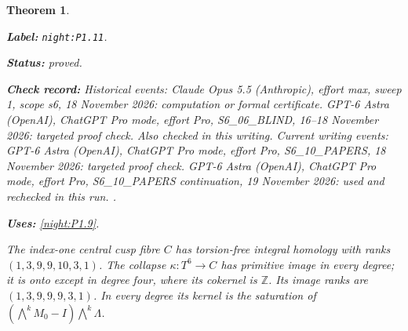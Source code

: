 \documentclass[11pt,a4paper]{article}
\newtheorem{theorem}{Theorem}[section]
\theoremstyle{definition}
\newcommand{\StatementRecord}[4]{\par\smallskip\begingroup\upshape\raggedright\noindent\textbf{Label:} \nolinkurl{#1}.\par\noindent\textbf{Status:} #2.\par\noindent\textbf{Check record:} #3.\par\noindent\textbf{Uses:} #4.\par\endgroup\smallskip}
\begin{document}
\begin{theorem}\label{night:P1.11}
\StatementRecord{night:P1.11}{proved}{Historical events: Claude Opus 5.5 (Anthropic), effort max, sweep 1, scope s6, 18 November 2026: computation or formal certificate. GPT-6 Astra (OpenAI), ChatGPT Pro mode, effort Pro, S6\_06\_BLIND, 16--18 November 2026: targeted proof check. Also checked in this writing. Current writing events: GPT-6 Astra (OpenAI), ChatGPT Pro mode, effort Pro, S6\_10\_PAPERS, 18 November 2026: targeted proof check. GPT-6 Astra (OpenAI), ChatGPT Pro mode, effort Pro, S6\_10\_PAPERS continuation, 19 November 2026: used and rechecked in this run. }{\cref{night:P1.9}}
The index-one central cusp fibre $C$ has torsion-free integral homology
with ranks $(1,3,9,9,10,3,1)$.
The collapse $\kappa:T^6\to C$ has primitive image in every degree;
it is onto except in degree four, where its cokernel is $\mathbb Z$.
Its image ranks are $(1,3,9,9,9,3,1)$.
In every degree its kernel is the saturation of
$(\bigwedge^kM_0-I)\bigwedge^k\Lambda$.
\end{theorem}
\end{document}
